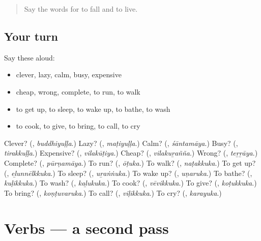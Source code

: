 \label{lesson:ML-R176-first-pass-describing-words-and-verbs}



\begin{quote}
Say the words for to fall and to live.
\end{quote}

\subsection*{Your turn}
Say these aloud:

\begin{itemize}
\raggedright
  \item clever, lazy, calm, busy, expensive
  \item cheap, wrong, complete, to run, to walk
  \item to get up, to sleep, to wake up, to bathe, to wash
  \item to cook, to give, to bring, to call, to cry
\end{itemize}

\begin{tcolorbox}[breakable,colback=teal!4,colframe=teal!35!black,title={Before you move on}]
Clever? (\textbf{}, \emph{buddhiyuḷḷa}.) Lazy? (\textbf{}, \emph{maṭiyuḷḷa}.) Calm? (\textbf{}, \emph{śāntamāya}.) Busy? (\textbf{}, \emph{tirakkuḷḷa}.) Expensive? (\textbf{}, \emph{vilakūṭiya}.) Cheap? (\textbf{}, \emph{vilakuṟañña}.) Wrong? (\textbf{}, \emph{teṟṟāya}.) Complete? (\textbf{}, \emph{pūrṇamāya}.) To run? (\textbf{}, \emph{ōṭuka}.) To walk? (\textbf{}, \emph{naṭakkuka}.) To get up? (\textbf{}, \emph{eḻunnēlkkuka}.) To sleep? (\textbf{}, \emph{uṟaṅṅuka}.) To wake up? (\textbf{}, \emph{uṇaruka}.) To bathe? (\textbf{}, \emph{kuḷikkuka}.) To wash? (\textbf{}, \emph{kaḻukuka}.) To cook? (\textbf{}, \emph{vēvikkuka}.) To give? (\textbf{}, \emph{koṭukkuka}.) To bring? (\textbf{}, \emph{koṇṭuvaruka}.) To call? (\textbf{}, \emph{viḷikkuka}.) To cry? (\textbf{}, \emph{karayuka}.)
\end{tcolorbox}
\section[(dialogue)]{Verbs — a second pass}

\label{lesson:ML-R176-second-pass-verbs}



